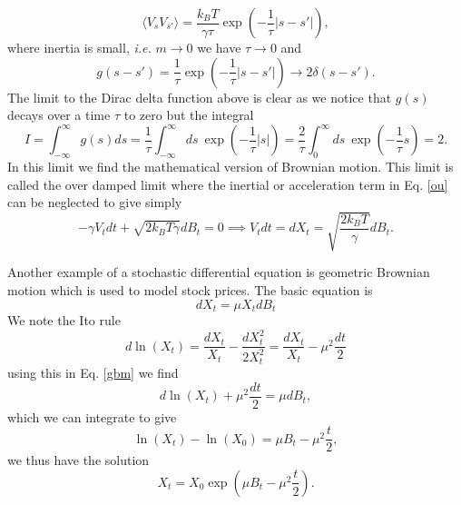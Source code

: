 \documentclass[11pt]{report}
\begin{document}
\begin{equation}
\langle V_sV_{s'}\rangle  =  \frac{k_BT}{\gamma\tau} \exp(-\frac{1}{\tau} |s-s'|),
\end{equation}
where inertia is small, {\em i.e.} $m\to 0$ we have $\tau\to 0$ and
\begin{equation}
g(s-s')= \frac{1}{\tau} \exp(-\frac{1}{\tau} |s-s'|) \to 2\delta(s-s').
\end{equation}
The limit to the Dirac delta function above is clear as we notice that $g(s)$ decays over a time  $\tau$ to zero but the integral
\begin{equation}
I = \int_{-\infty}^\infty g(s) ds = \frac{1}{\tau}\int_{-\infty}^\infty ds\ \exp(-\frac{1}{\tau} |s|)
= \frac{2}{\tau}\int_0^\infty ds\ \exp(-\frac{1}{\tau} s) = 2.
\end{equation} 
 In this limit we find the mathematical version of Brownian motion. This limit is called the over damped limit where the inertial or acceleration term in Eq. \eqref{ou} can be neglected to give simply
\begin{equation}
-\gamma V_t dt + \sqrt{2k_BT \gamma}dB_t = 0 \implies V_t dt = dX_t =\sqrt{\frac{2k_BT}{\gamma}} dB_t.
\end{equation}

Another example of a stochastic differential equation is geometric Brownian motion which is used to model stock prices. The basic equation is
\begin{equation}
dX_t = \mu X_t dB_t \label{gbm}
\end{equation}
We note the Ito rule
\begin{equation}
d\ln(X_t) =\frac{dX_t}{X_t}-\frac{dX_t^2}{2 X_t^2}= \frac{dX_t}{X_t}-\mu^2\frac{dt}{2}
\end{equation}
using this in Eq. \eqref{gbm} we find
\begin{equation}
d\ln(X_t)+ \mu^2\frac{dt}{2} = \mu dB_t,
\end{equation}
which we can integrate to give
\begin{equation}
\ln(X_t)-\ln(X_0) = \mu B_t - \mu^2\frac{t}{2},
\end{equation}
we thus have the solution
\begin{equation}
X_t = X_0\exp(\mu B_t- \mu^2\frac{t}{2}).
\end{equation}
\end{document}
